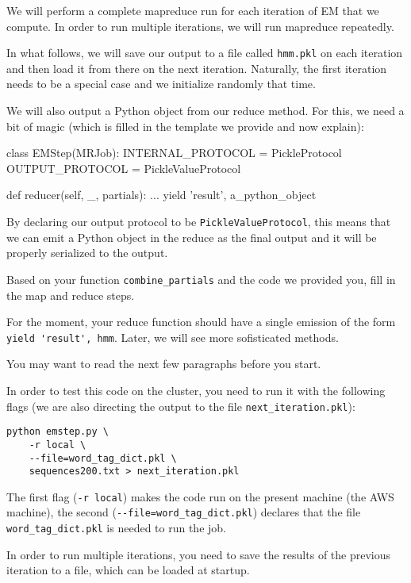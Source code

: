 We will perform a complete mapreduce run for each iteration of EM that we
compute. In order to run multiple iterations, we will run mapreduce repeatedly.

In what follows, we will save our output to a file called \verb+hmm.pkl+ on
each iteration and then load it from there on the next iteration. Naturally,
the first iteration needs to be a special case and we initialize randomly that
time.

We will also output a Python object from our reduce method. For this, we need a
bit of magic (which is filled in the template we provide and now explain):

\begin{python}
class EMStep(MRJob):
    INTERNAL_PROTOCOL   = PickleProtocol
    OUTPUT_PROTOCOL     = PickleValueProtocol

    def reducer(self, _, partials):
        ...
        yield 'result', a_python_object
\end{python}

By declaring our output protocol to be \verb+PickleValueProtocol+, this means
that we can emit a Python object in the reduce as the final output and it will
be properly serialized to the output.

\begin{exercise}
Based on your function \verb+combine_partials+ and the code we provided you, fill in
the map and reduce steps.

For the moment, your reduce function should have a single emission of the form
\verb+yield 'result', hmm+. Later, we will see more sofisticated methods.

You may want to read the next few paragraphs before you start.
\end{exercise}

In order to test this code on the cluster, you need to run it with the
following flags (we are also directing the output to the file
\verb+next_iteration.pkl+):

\begin{verbatim}
python emstep.py \
    -r local \
    --file=word_tag_dict.pkl \
    sequences200.txt > next_iteration.pkl
\end{verbatim}

The first flag (\verb+-r local+) makes the code run on the present machine (the AWS machine), the second
(\verb+--file=word_tag_dict.pkl+) declares that the file
\verb+word_tag_dict.pkl+ is needed to run the job.

In order to run multiple iterations, you need to save the results of the
previous iteration to a file, which can be loaded at startup.

